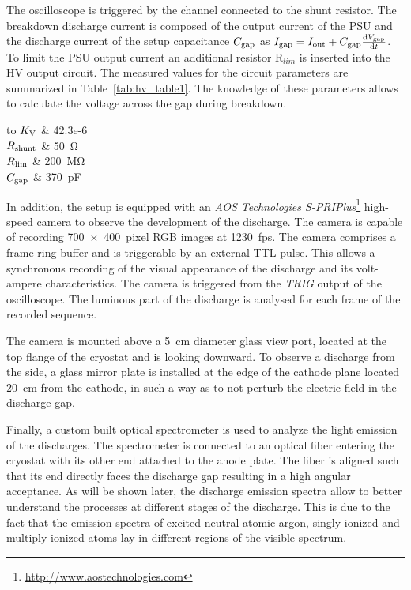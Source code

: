 The oscilloscope is triggered by the channel connected to the shunt resistor.
The breakdown discharge current is composed of the output current of the PSU and the discharge current of the setup capacitance $C_{\mathrm{gap}}$ as $I_{\mathrm{gap}} = I_{\mathrm{out}} + C_{\mathrm{gap}}\frac{\mathrm{d}V_{\mathrm{gap}}}{\mathrm{d}t}$.
To limit the PSU output current an additional resistor R$_{lim}$ is inserted into the HV output circuit.
The measured values for the circuit parameters are summarized in Table~\ref{tab:hv_table1}.
The knowledge of these parameters allows to calculate the voltage across the gap during breakdown. 

\begin{table}[htb]
	\centering
	\caption{Summary of the measured parameters of the test circuit.}
	\label{tab:hv_table1}
	\begin{tabu} to \textwidth {|l|S|}
		\hline
		$K_{\mathrm{V}}$ & 		42.3e-6 \\
		\hline
		$R_{\mathrm{shunt}}$ &	\SI{50}{\ohm} \\
		\hline
		$R_{\mathrm{lim}}$ & 	\SI{200}{\mega\ohm} \\
		\hline
		$C_{\mathrm{gap}}$ & 	\SI{370}{\pico\farad} \\
		\hline
	\end{tabu}
\end{table}

In addition, the setup is equipped with an \emph{AOS Technologies S-PRI\emph{Plus}}\footnote{\href{http://www.aostechnologies.com}{http://www.aostechnologies.com}} high-speed camera to observe the development of the discharge. The camera is capable of recording \num{700 x 400}~pixel RGB images at \SI{1230}{fps}.
The camera comprises a frame ring buffer and is triggerable by an external TTL pulse.
This allows a synchronous recording of the visual appearance of the discharge and its volt-ampere characteristics.
The camera is triggered from the \emph{TRIG} output of the oscilloscope.
The luminous part of the discharge is analysed for each frame of the recorded sequence.

The camera is mounted above a \SI{5}{\centi\metre} diameter glass view port, located at the top flange of the cryostat and is looking downward.
To observe a discharge from the side, a glass mirror plate is installed at the edge of the cathode plane located \SI{20}{\centi\metre} from the cathode, in such a way as to not perturb the electric field in the discharge gap. 

Finally, a custom built optical spectrometer is used to analyze the light emission of the discharges.
The spectrometer is connected to an optical fiber entering the cryostat with its other end attached to the anode plate.
The fiber is aligned such that its end directly faces the discharge gap resulting in a high angular acceptance.
As will be shown later, the discharge emission spectra allow to better understand the processes at different stages of the discharge.
This is due to the fact that the emission spectra of excited neutral atomic argon, singly-ionized and multiply-ionized atoms lay in different regions of the visible spectrum.

